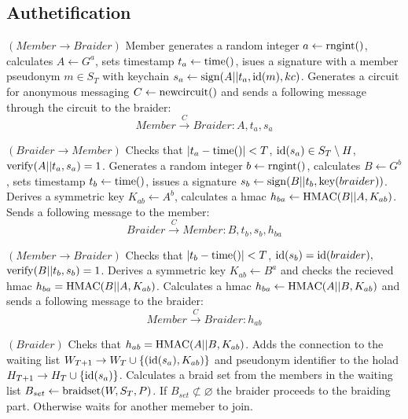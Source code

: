 \documentclass[12pt]{article}
\begin{document}
\subsection*{Authetification}


\begin{steps}
\item $(Member \to Braider)$ Member generates a random integer $a \leftarrow {\rm rngint}()$, calculates $A \leftarrow G^a$, sets timestamp $t_a \leftarrow {\rm time}()$, isues a signature with a member pseudonym $m \in S_T$ with keychain $s_a \leftarrow {\rm sign}(A || t_a, {\rm id}(m), kc)$. Generates a circuit for anonymous messaging $C \leftarrow {\rm newcircuit}()$ and sends a following message through the circuit to the braider:
  \begin{equation}
    Member \overset{C}{\to} Braider: A, t_a, s_a  
  \end{equation}

\item $(Braider \to Member)$ Checks that $|t_a - {\rm time}()| < T$, ${\rm id}(s_a) \in S_T \setminus H$, ${\rm verify}(A||t_a,s_a) = 1$. Generates a random integer $b \leftarrow {\rm rngint}()$, calculates $B \leftarrow G^b$, sets timestamp $t_b \leftarrow {\rm time}()$, issues a signature $s_b \leftarrow  {\rm sign}(B || t_b, {\rm key}(braider))$. Derives a symmetric key $K_{ab} \leftarrow A^b$, calculates a hmac $h_{ba} \leftarrow {\rm HMAC}(B||A,K_{ab})$. Sends a following message to the member:
  \begin{equation}
    Braider \overset{C}{\to} Member: B, t_b, s_b, h_{ba}
  \end{equation}

\item $(Member \to Braider)$ Checks that $|t_b - {\rm time}()| < T$, ${\rm id}(s_b)={\rm id}(braider),$ ${\rm verify}(B||t_b,s_b)=1$. Derives a symmetric key $K_{ab} \leftarrow B^a$ and checks the recieved hmac $h_{ba} = {\rm HMAC}(B||A,K_{ab})$. Calculates a hmac $h_{ba} \leftarrow {\rm HMAC}(A||B,K_{ab})$ and sends a following message to the braider:
  \begin{equation}
    Member \overset{C}{\to} Braider: h_{ab}
  \end{equation}

\item $(Braider)$ Cheks that $h_{ab} = {\rm HMAC}(A||B, K_{ab})$. Adds the connection to the waiting list $W_{T+1} \to W_T \cup \left\{ ({\rm id}(s_a), K_{ab}) \right\}$ and pseudonym identifier to the holad $H_{T+1} \to H_T \cup \{ {\rm id}(s_a)\}$. Calculates a braid set from the members in the waiting list $B_{set} \leftarrow {\rm braidset}(W, S_T, P)$. If $B_{set}\not\subset \varnothing$ the braider proceeds to the braiding part. Otherwise waits for another memeber to join.
\end{steps}
\end{document}
